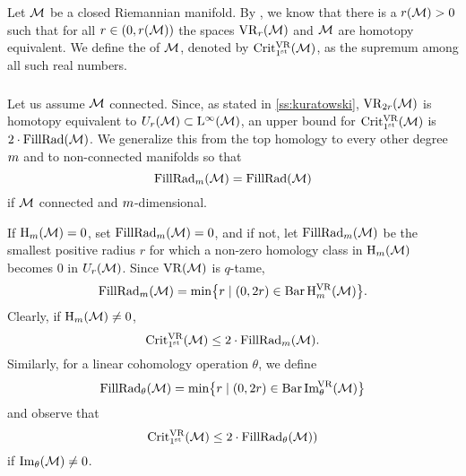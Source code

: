 \subsubsection{}\label{ss:first_critical_value}

Let \(\cM\) be a closed Riemannian manifold.
By \cite[Thm.3.5]{hausmann1995vietoris}, we know that there is a \(r(\cM) > 0\) such that for all \(r \in (0,r(\cM))\) the spaces \(\VR_r(\cM)\) and \(\cM\) are homotopy equivalent.
We define the  of \(\cM\), denoted by \(\crit(\cM)\), as the supremum among all such real numbers.


\subsubsection{}
\label{subsub:beta v.s. fillrad}

Let us assume \(\cM\) connected.
Since, as stated in \cref{ss:kuratowski}, \(\VR_{2r}(\cM)\) is homotopy equivalent to \(U_r(\cM) \subset \rL^\infty(\cM)\), an upper bound for \(\crit(\cM)\) is \(2\cdot\fillrad(\cM)\).
We generalize this from the top homology to every other degree \(\degp\) and to non-connected manifolds so that
\[
\fillrad_\degp(\cM) = \fillrad(\cM)
\]
if \(\cM\) connected and \(\degp\)-dimensional.

If \(\rH_\degp(\cM) = 0\), set \(\fillrad_m(\cM) = 0\), and if not, let \(\fillrad_m(\cM)\) be the smallest positive radius $r$ for which a non-zero homology class in \(\rH_\degp(\cM)\) becomes \(0\) in \(U_r(\cM)\).
Since \(\VR(\cM)\) is \(q\)-tame,
\[
\fillrad_m(\cM) = \min\set[\big]{r \mid (0, 2r) \in \barc \rH^{\VR}_m(\cM)}.
\]
Clearly, if \(\rH_m(\cM) \neq 0\),
\[
\crit(\cM) \leq 2 \cdot \fillrad_m(\cM).
\]
Similarly, for a linear cohomology operation \(\theta\), we define
\[
\fillrad_\theta(\cM) = \min\set[\big]{r \mid (0, 2r) \in \barc \img_\theta^{\!\VR}(\cM)}
\]
and observe that
\[
\crit(\cM) \leq 2 \cdot \fillrad_\theta(\cM))
\]
if \(\img_\theta(\cM) \neq 0\).


